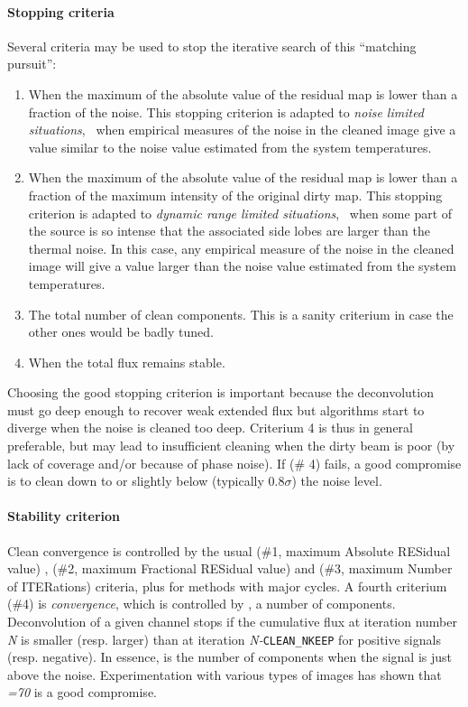 \paragraph{Stopping criteria}

Several criteria may be used to stop the iterative search of this
``matching pursuit'':
\begin{enumerate}
\item When the maximum of the absolute value of the residual map is lower
  than a fraction of the noise. This stopping criterion is adapted to
  \emph{noise limited situations}, \ie\ when empirical measures of the
  noise in the cleaned image give a value similar to the noise value
  estimated from the system temperatures.
\item When the maximum of the absolute value of the residual map is lower
  than a fraction of the maximum intensity of the original dirty map.  This
  stopping criterion is adapted to \emph{dynamic range limited situations}, \ie\ 
  when some part of the source is so intense that the associated side lobes
  are larger than the thermal noise. In this case, any empirical measure of
  the noise in the cleaned image will give a value larger than the noise
  value estimated from the system temperatures.
\item The total number of clean components. This is a sanity criterium in
  case the other ones would be badly tuned.
\item When the total flux remains stable.
\end{enumerate}
Choosing the good stopping criterion is important because the 
deconvolution must go deep enough to recover weak extended flux  but 
\clean{} algorithms start to diverge when the noise is cleaned too 
deep. Criterium 4 is thus in general preferable, but may lead to 
insufficient cleaning when the dirty beam is poor (by lack of \uv{} 
coverage and/or because of phase noise). If (\# 4) fails, a good 
compromise is to clean down to or slightly below (typically 
$0.8\sigma$) the noise level.

\paragraph{Stability criterion}

Clean convergence is controlled by the usual  (\#1, 
maximum Absolute RESidual value) , \sicvar{FRES} (\#2, maximum 
Fractional RESidual value) and  (\#3, maximum Number of 
ITERations) criteria, plus \sicvar{CLEAN\_NCYCLE} for methods with 
major cycles. A fourth criterium  (\#4) is \textit{convergence}, which  
is controlled by \sicvar{CLEAN\_NKEEP}, a number of components. 
Deconvolution of a given channel stops if the cumulative flux at 
iteration number \textit{N} is smaller (resp. larger) than at iteration 
\textit{N-}\texttt{CLEAN\_NKEEP} for positive signals (resp. negative). In 
essence, \sicvar{CLEAN\_NKEEP} is the number of components when the 
signal is just above the noise. Experimentation with various types of 
images has shown that \sicvar{CLEAN\_KEEP}\textit{=70} is a good compromise. 

